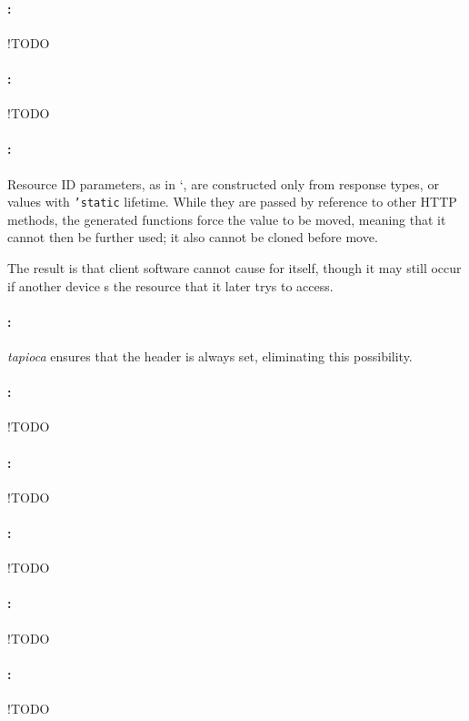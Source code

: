 \paragraph{:} !TODO

\paragraph{:} !TODO

\paragraph{:} Resource ID parameters, as in `, are constructed only from response types, or values with \texttt{'static} lifetime. While they are passed by reference to other HTTP methods, the generated  functions force the value to be moved, meaning that it cannot then be further used; it also cannot be cloned before move.

The result is that client software cannot cause  for itself, though it may still occur if another device s the resource that it later trys to access.

\paragraph{:} \emph{tapioca} ensures that the  header is always set, eliminating this possibility.

\paragraph{:} !TODO

\paragraph{:} !TODO
\paragraph{:} !TODO
\paragraph{:} !TODO
\paragraph{:} !TODO
